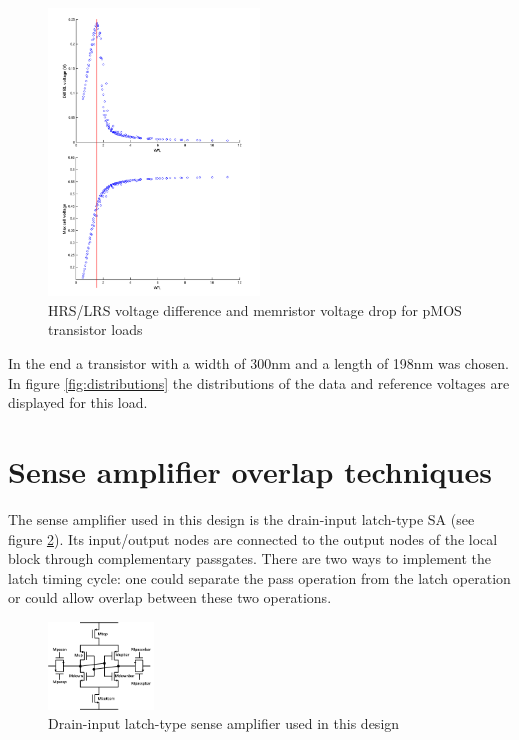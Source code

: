 \documentclass[journal]{IEEEtran}
\begin{document}
\begin{figure}[ht!]
  \centering
  \includegraphics[width=0.5\textwidth]{../fig/hfdst-last-length.png}
  \caption{HRS/LRS voltage difference and memristor voltage drop for pMOS transistor loads}
  \label{fig:switchloadresults}
\end{figure}

In the end a transistor with a width of 300nm and a length of 198nm was chosen. In figure \ref{fig:distributions} the distributions of the data and reference voltages are displayed for this load.


\section{Sense amplifier overlap techniques}
The sense amplifier used in this design is the drain-input latch-type SA (see figure \ref{fig:ourSA}). Its input/output nodes are connected to the output nodes of the local block through complementary passgates. There are two ways to implement the latch timing cycle: one could separate the pass operation from the latch operation or could allow overlap between these two operations.

\begin{figure}[ht!]
  \centering
  \includegraphics[width=0.25\textwidth]{../fig/hfdstk-sensamp-ourSA.png}
  \caption{Drain-input latch-type sense amplifier used in this design}
  \label{fig:ourSA}
\end{figure}
\end{document}
